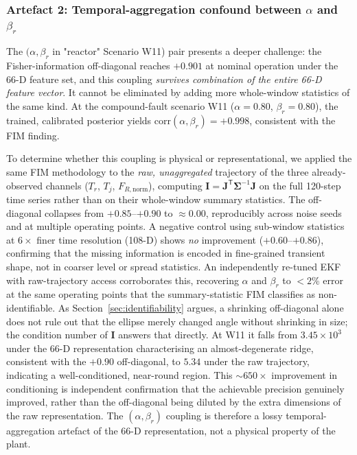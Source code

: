 \documentclass[aps,pre,twocolumn,superscriptaddress]{revtex4-2}
\begin{document}
\subsubsection{Artefact 2: Temporal-aggregation confound between
  \texorpdfstring{$\alpha$}{alpha} and
  \texorpdfstring{$\beta_r$}{beta_r}}
\label{sec:wu_artifact2}

The $(\alpha, \beta_r$ in "reactor" Scenario W11) pair presents a deeper challenge: the Fisher-information
off-diagonal reaches $+0.901$ at nominal operation under the 66-D feature set, and
this coupling \emph{survives combination of the entire 66-D feature vector}. It cannot be eliminated by adding more whole-window statistics of the same kind. At the compound-fault scenario W11 ($\alpha = 0.80$, $\beta_r = 0.80$),
the trained, calibrated posterior yields $\mathrm{corr}(\alpha,\beta_r) = +0.998$,
consistent with the FIM finding.

To determine whether this coupling is physical or representational, we applied
the same FIM methodology to the \emph{raw, unaggregated} trajectory of the
three already-observed channels ($T_r$, $T_j$, $F_{R,\mathrm{norm}}$), computing
$\mathbf{I} = \mathbf{J}^\mathsf{T}\boldsymbol{\Sigma}^{-1}\mathbf{J}$ on the
full 120-step time series rather than on their whole-window summary statistics.
The off-diagonal collapses from $+0.85$--$+0.90$ to $\approx 0.00$,
reproducibly across noise seeds and at multiple operating points. A negative
control using sub-window statistics at $6\times$ finer time resolution (108-D)
shows \emph{no} improvement ($+0.60$--$+0.86$), confirming that the missing
information is encoded in fine-grained transient shape, not in coarser level
or spread statistics. An independently re-tuned EKF with raw-trajectory access
corroborates this, recovering $\alpha$ and $\beta_r$ to $<2$\% error at the same
operating points that the summary-statistic FIM classifies as non-identifiable.
As Section~\ref{sec:identifiability} argues, a shrinking off-diagonal alone
does not rule out that the ellipse merely changed angle without shrinking in
size; the condition number of $\mathbf{I}$ answers that directly. At W11 it
falls from $3.45\times10^3$ under the 66-D representation characterising an
almost-degenerate ridge, consistent with the $+0.90$ off-diagonal, to
$5.34$ under the raw trajectory, indicating a well-conditioned, near-round region.  This
$\sim\!650\times$ improvement in conditioning is independent confirmation
that the achievable precision genuinely improved, rather than the
off-diagonal being diluted by the extra dimensions of the raw representation.
The $(\alpha, \beta_r)$ coupling is therefore a lossy temporal-aggregation
artefact of the 66-D representation, not a physical property of the plant.
\end{document}
